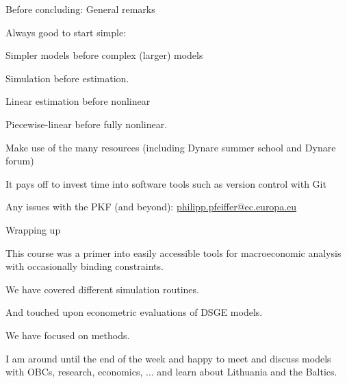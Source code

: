 \begin{frame}{Before concluding: General remarks}
\begin{wideitemize}
\item Always good to start simple:
\begin{wideitemize}
    \item Simpler models before complex (larger) models
    \item Simulation before estimation.
    \item Linear estimation before nonlinear
    \item Piecewise-linear before fully nonlinear.
\end{wideitemize}
\item Make use of the many resources (including Dynare summer school and Dynare forum)
\item It pays off to invest time into software tools such as version control with Git
\item Any issues with the PKF (and beyond): \href{mailto:philipp.pfeiffer@ec.europa.eu}{philipp.pfeiffer@ec.europa.eu}
\end{wideitemize}
\end{frame}


\begin{frame}{Wrapping up}
\begin{wideitemize}
\item This course was a primer into easily accessible tools for macroeconomic analysis with occasionally binding constraints.
\item We have covered different simulation routines.
\item And touched upon econometric evaluations of DSGE models.
\item We have focused on  methods.
\pause
\item I am around until the end of the week and happy to meet and discuss models with OBCs, research, economics, ... and learn about Lithuania and the Baltics.
\item {}
\end{wideitemize}
\end{frame}